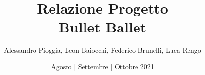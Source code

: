 \documentclass[a4paper,12pt]{report}
\title{Relazione Progetto \\ \textbf{Bullet Ballet}}
\author{Alessandro Pioggia, Leon Baiocchi, Federico Brunelli, Luca Rengo}
\date{Agosto | Settembre | Ottobre 2021}
\begin{document}
\makeatletter
\begin{titlepage}
	\begin{center}
		{\Huge  \@title }\\[3ex] 
		{\large  \@author}\\[3ex] 
		{\large \@date}
	\end{center}
\end{titlepage}
\makeatother
\thispagestyle{empty}
\newpage


\tableofcontents



%










\end{document}
